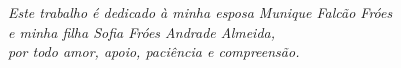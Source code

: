 
\begin{dedicatoria}
   \vspace*{\fill}
   \centering
   \noindent
   \textit{ Este trabalho é dedicado à minha esposa Munique Falcão Fróes \\
   e minha filha Sofia Fróes Andrade Almeida, \\
   por todo amor, apoio, paciência e compreensão.} \vspace*{\fill}
\end{dedicatoria}
